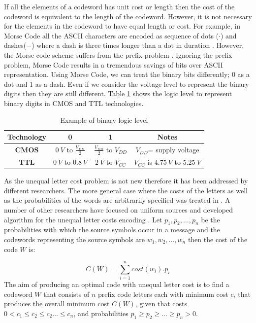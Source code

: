 \documentclass[preprint,12pt]{elsarticle}
\begin{document}
If all the elements of a codeword has unit cost or length then the cost of the codeword is equivalent to the length of the codeword. However, it is not necessary for the elements in the codeword to have equal length or cost. For example, in Morse Code all the ASCII characters are encoded as sequence of dots ($\cdot$) and dashes($-$) where a dash is three times longer than a dot in duration \cite{Redmond09}. However, the Morse code scheme suffers from the prefix problem \cite{Gr03}. Ignoring the prefix problem, Morse Code results in a tremendous savings of bits over ASCII representation. Using Morse Code, we can treat the binary bits differently; 0 as a dot and 1 as a dash. Even if we consider the voltage level to represent the binary digits then they are still different. Table \ref{table1} shows the logic level to represent binary digits in CMOS and TTL technologies. 

\begin{table}[thpb]
\renewcommand{\arraystretch}{1.5}
\caption{Example of binary logic level}
\label{table1}
\centering
\begin{tabular}{c c c c}
\hline
 \bfseries Technology  & 0 & 1&Notes\\
\hline
\bfseries CMOS & $0~V$ to $\frac{V_{DD}}{2}$&$\frac{V_{DD}}{2}$ to $V_{DD}$&$V_{DD}$= supply voltage\\
\bfseries TTL & $0~V$ to $0.8~V$&$2~V$ to $V_{CC}$ &$V_{CC}$ is $4.75~V$ to $5.25~V$\\
\hline
\end{tabular}
\end{table}

As the unequal letter cost problem is not new therefore it has been addressed by different researchers. The more general case where the costs of the letters as well as the probabilities of the words are arbitrarily specified was treated in \cite{Karp61}. A number of other researchers have focused on uniform sources and developed algorithm for the unequal letter costs encoding \cite{Gil95, Kar62,Varn71,AltMel80,perl1975}.  Let $p_1,p_2,\ldots,p_n$ be the probabilities with which the source symbols occur in a message and the codewords representing the source symbols are $w_1,w_2,\ldots,w_n$ then the cost of the code $W$ is:

\begin{equation}
C\left(W\right)=\sum_{i=1}^{n}cost\left(w_i\right).p_i 
\end{equation}
The aim of producing an optimal code with unequal letter cost is to find a codeword $W$ that consists of $n$ prefix code letters each with minimum cost $c_i$ that produces the overall minimum cost $C\left(W\right)$, given that costs $0<c_1\leq c_2 \leq c_2 \ldots \leq c_n$, and probabilities $p_1\geq p_2\geq \ldots\geq p_n>0$.
\end{document}
